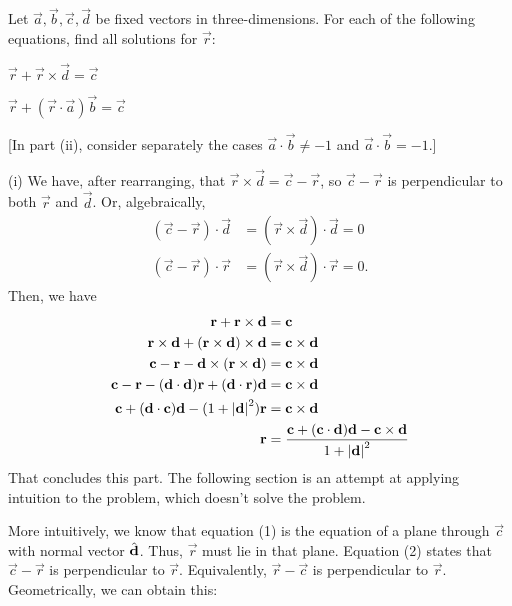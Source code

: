 \documentclass[12pt]{article}
\begin{document}
    \begin{question}
        Let $\vec{a},\vec{b},\vec{c},\vec{d}$ be fixed vectors in three-dimensions.
        For each of the following equations, find all solutions for $\vec{r}$:
        \begin{compactenum}[(i)]
        \item $\vec{r} + \vec{r}\times\vec{d} = \vec{c}$
        \item $\vec{r} + (\vec{r}\cdot\vec{a})\vec{b} = \vec{c}$
        \end{compactenum}
        [In part (ii), consider separately the cases $\vec{a}\cdot\vec{b} \ne -1$
        and $\vec{a}\cdot\vec{b} = -1$.]
    \end{question}
    \begin{answer}
        (i)
        We have, after rearranging, that $\vec{r}\times\vec{d} = \vec{c}-\vec{r}$,
        so $\vec{c}-\vec{r}$ is perpendicular to both $\vec{r}$ and $\vec{d}$.
        Or, algebraically,
        \setcounter{equation}{0}
        \begin{align}
            (\vec{c}-\vec{r})\cdot\vec{d} 
            &= (\vec{r}\times\vec{d})\cdot\vec{d} = 0\\
            (\vec{c}-\vec{r})\cdot\vec{r} 
            &= (\vec{r}\times\vec{d})\cdot\vec{r} = 0.
        \end{align}
        Then, we have
        \begin{align*}
            \mathbf{r} + \mathbf{r}\times\mathbf{d} &= \mathbf{c}\\
            \mathbf{r}\times\mathbf{d} + (\mathbf{r}\times\mathbf{d})\times\mathbf{d} &= \mathbf{c}\times\mathbf{d}\\
            \mathbf{c} - \mathbf{r} - \mathbf{d}\times(\mathbf{r}\times\mathbf{d}) &= \mathbf{c}\times\mathbf{d}\\
            \mathbf{c} - \mathbf{r} - (\mathbf{d}\cdot\mathbf{d})\mathbf{r} + (\mathbf{d}\cdot\mathbf{r})\mathbf{d} 
            &= \mathbf{c}\times\mathbf{d}\\
            \mathbf{c} + (\mathbf{d}\cdot\mathbf{c})\mathbf{d} - (1+\left\lvert \mathbf{d} \right\rvert^{2})\mathbf{r}
            &= \mathbf{c}\times\mathbf{d}\\
            \mathbf{r}
            &= \frac{\mathbf{c} + (\mathbf{c}\cdot\mathbf{d})\mathbf{d} - \mathbf{c}\times\mathbf{d}}{1+\left\lvert \mathbf{d} \right\rvert^{2}}
        \end{align*}
        That concludes this part. The following section
        is an attempt at applying intuition to the problem,
        which doesn't solve the problem.

        More intuitively, we know that 
        equation (1) is the equation of a plane through $\vec{c}$
        with normal vector $\hat{\mathbf{d}}$. Thus, $\vec{r}$ must lie in that plane.
        Equation (2) states that $\vec{c}-\vec{r}$ is perpendicular to $\vec{r}$.
        Equivalently, $\vec{r}-\vec{c}$ is perpendicular to $\vec{r}$.
        Geometrically, we can obtain this:


\end{answer}
\end{document}

